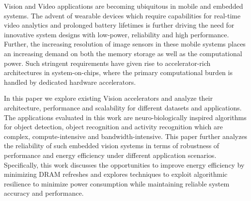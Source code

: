 Vision and Video applications are becoming ubiquitous in mobile and embedded systems. The advent of wearable devices which require capabilities for real-time video analytics and prolonged battery lifetimes is further driving the need for innovative system designs with low-power, reliability and high performance. Further, the increasing resolution of image sensors in these mobile systems places an increasing demand on both the memory storage as well as the computational power. Such stringent requirements have given rise to accelerator-rich architectures in system-on-chips, where the primary computational burden is handled by dedicated hardware accelerators.
 
In this paper we explore existing Vision accelerators and analyze their architecture, performance and scalability for different datasets and applications. The applications evaluated in this work are neuro-biologically inspired algorithms for object detection, object recognition and activity recognition which are complex, compute-intensive and bandwidth-intensive. This paper further analyzes the reliability of such embedded vision systems in terms of robustness of performance and energy efficiency under different application scenarios. Specifically, this work discusses the   opportunities to improve energy efficiency by minimizing DRAM refreshes and explores techniques to exploit algorithmic resilience to minimize power consumption while maintaining reliable system accuracy and performance.

